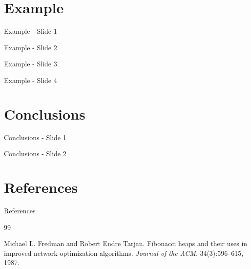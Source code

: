 \documentclass{beamer}
\begin{document}
\section{Example}
\begin{frame}{Example - Slide 1}\end{frame}
\begin{frame}{Example - Slide 2}\end{frame}
\begin{frame}{Example - Slide 3}\end{frame}
\begin{frame}{Example - Slide 4}\end{frame}

\section{Conclusions}
\begin{frame}{Conclusions - Slide 1}\end{frame}
\begin{frame}{Conclusions - Slide 2}\end{frame}

\section{References}
\begin{frame}{References}
  \begin{thebibliography}{99}
    
    Michael L. Fredman and Robert Endre Tarjan.
    \newblock Fibonacci heaps and their uses in improved network optimization algorithms.
    \newblock \emph{Journal of the ACM}, 34(3):596--615, 1987.
    
  \end{thebibliography}
\end{frame}
\end{document}
